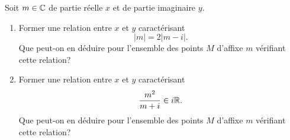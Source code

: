 Soit $m\in \mathbb{C}$ de partie réelle $x$ et de partie imaginaire $y$.
\begin{enumerate}
 \item Former une relation entre $x$ et $y$ caractérisant
\begin{displaymath}
 |m| = 2 |m-i|.
\end{displaymath}
Que peut-on en déduire pour l'ensemble des points $M$ d'affixe $m$ vérifiant cette relation?

 \item Former une relation entre $x$ et $y$ caractérisant
\begin{displaymath}
 \frac{m^2}{m+i}\in i\mathbb{R} .
\end{displaymath}
Que peut-on en déduire pour l'ensemble des points $M$ d'affixe $m$ vérifiant cette relation?
\end{enumerate}

